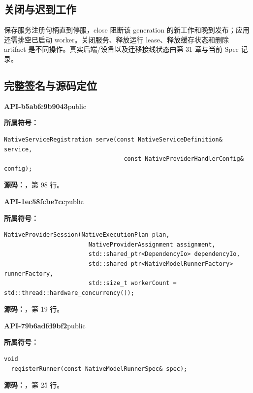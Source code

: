 \subsection{关闭与迟到工作}
保存服务注册句柄直到停服，close 阻断该 generation 的新工作和晚到发布；应用还需排空已启动 worker。关闭服务、释放运行 lease、释放缓存状态和删除 artifact 是不同操作。真实后端/设备以及迁移接线状态由第 31 章与当前 Spec 记录。

\subsection{完整签名与源码定位}

\textbf{API-b5abfc9b9043}\quad public\par
\textbf{所属符号：}\par
\begin{Verbatim}[fontsize=\footnotesize,breaklines,breakanywhere]
NativeServiceRegistration serve(const NativeServiceDefinition& service,
                                  const NativeProviderHandlerConfig& config);
\end{Verbatim}
\textbf{源码：}，第 98 行。\par

\textbf{API-1ec58fcbe7cc}\quad public\par
\textbf{所属符号：}\par
\begin{Verbatim}[fontsize=\footnotesize,breaklines,breakanywhere]
NativeProviderSession(NativeExecutionPlan plan,
                        NativeProviderAssignment assignment,
                        std::shared_ptr<DependencyIo> dependencyIo,
                        std::shared_ptr<NativeModelRunnerFactory> runnerFactory,
                        std::size_t workerCount = std::thread::hardware_concurrency());
\end{Verbatim}
\textbf{源码：}，第 19 行。\par

\textbf{API-79b6adfd9bf2}\quad public\par
\textbf{所属符号：}\par
\begin{Verbatim}[fontsize=\footnotesize,breaklines,breakanywhere]
void
  registerRunner(const NativeModelRunnerSpec& spec);
\end{Verbatim}
\textbf{源码：}，第 25 行。\par

